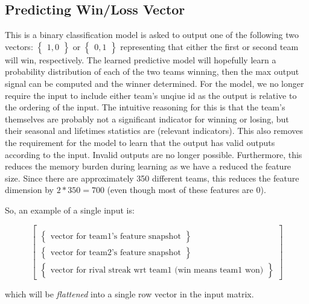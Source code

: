 \documentclass{article} %
\begin{document}
\subsection{Predicting Win/Loss Vector}
\label{sec:io-architectures-symmetrical}

This is a binary classification model is asked to output one of the following two vectors: $\begin{Bmatrix} 1, 0 \end{Bmatrix}$ or $\begin{Bmatrix} 0, 1 \end{Bmatrix}$ representing that either the first or second team will win, respectively.
The learned predictive model will hopefully learn a probability distribution of each of the two teams winning, then the max output signal can be computed and the winner determined.
For the model, we no longer require the input to include either team's unqiue id as the output is relative to the ordering of the input.
The intuitive reasoning for this is that the team's themselves are probably not a significant indicator for winning or losing, but their seasonal and lifetimes statistics are (relevant indicators).
This also removes the requirement for the model to learn that the output has valid outputs according to the input.
Invalid outputs are no longer possible.
Furthermore, this reduces the memory burden during learning as we have a reduced the feature size.
Since there are approximately 350 different teams, this reduces the feature dimension by $2 * 350 = 700$ (even though most of these features are 0).

So, an example of a single input is:

\[
\begin{bmatrix}
  \\
  \begin{Bmatrix}
    \text{vector for team1's feature snapshot}
  \end{Bmatrix}
  \\
  \begin{Bmatrix}
    \text{vector for team2's feature snapshot}
  \end{Bmatrix}
  \\
  \begin{Bmatrix}
    \text{vector for rival streak wrt team1 (win means team1 won)}
  \end{Bmatrix}
\end{bmatrix}
\]

which will be \textit{flattened} into a single row vector in the input matrix.
\end{document}
